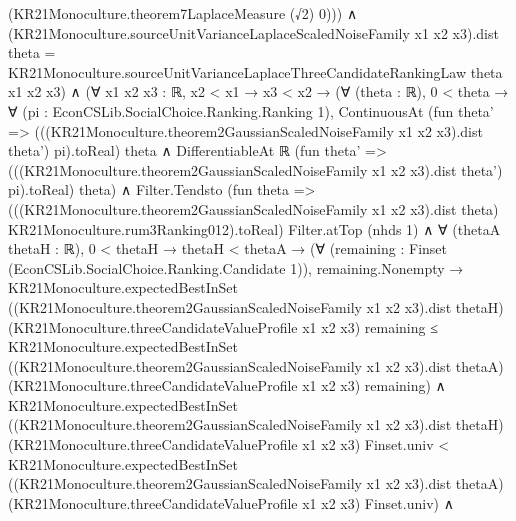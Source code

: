 \documentclass[10pt]{article}
\begin{document}
\begin{ReviewVerbatim}
                        (KR21Monoculture.theorem7LaplaceMeasure (√2) 0))) ∧
                (KR21Monoculture.sourceUnitVarianceLaplaceScaledNoiseFamily x1 x2 x3).dist theta =
                  KR21Monoculture.sourceUnitVarianceLaplaceThreeCandidateRankingLaw theta x1 x2 x3) ∧
        (∀ {x1 x2 x3 : ℝ},
            x2 < x1 →
              x3 < x2 →
                (∀ (theta : ℝ),
                    0 < theta →
                      ∀ (pi : EconCSLib.SocialChoice.Ranking.Ranking 1),
                        ContinuousAt
                            (fun theta' =>
                              (((KR21Monoculture.theorem2GaussianScaledNoiseFamily x1 x2 x3).dist theta') pi).toReal)
                            theta ∧
                          DifferentiableAt ℝ
                            (fun theta' =>
                              (((KR21Monoculture.theorem2GaussianScaledNoiseFamily x1 x2 x3).dist theta') pi).toReal)
                            theta) ∧
                  Filter.Tendsto
                      (fun theta =>
                        (((KR21Monoculture.theorem2GaussianScaledNoiseFamily x1 x2 x3).dist theta)
                            KR21Monoculture.rum3Ranking012).toReal)
                      Filter.atTop (nhds 1) ∧
                    ∀ (thetaA thetaH : ℝ),
                      0 < thetaH →
                        thetaH < thetaA →
                          (∀ (remaining : Finset (EconCSLib.SocialChoice.Ranking.Candidate 1)),
                              remaining.Nonempty →
                                KR21Monoculture.expectedBestInSet
                                    ((KR21Monoculture.theorem2GaussianScaledNoiseFamily x1 x2 x3).dist thetaH)
                                    (KR21Monoculture.threeCandidateValueProfile x1 x2 x3) remaining ≤
                                  KR21Monoculture.expectedBestInSet
                                    ((KR21Monoculture.theorem2GaussianScaledNoiseFamily x1 x2 x3).dist thetaA)
                                    (KR21Monoculture.threeCandidateValueProfile x1 x2 x3) remaining) ∧
                            KR21Monoculture.expectedBestInSet
                                ((KR21Monoculture.theorem2GaussianScaledNoiseFamily x1 x2 x3).dist thetaH)
                                (KR21Monoculture.threeCandidateValueProfile x1 x2 x3) Finset.univ <
                              KR21Monoculture.expectedBestInSet
                                ((KR21Monoculture.theorem2GaussianScaledNoiseFamily x1 x2 x3).dist thetaA)
                                (KR21Monoculture.threeCandidateValueProfile x1 x2 x3) Finset.univ) ∧

\end{ReviewVerbatim}
\end{document}
